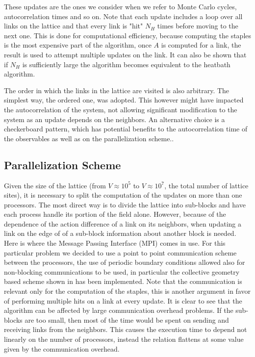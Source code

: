These updates are the ones we consider when we refer to Monte Carlo cycles, autocorrelation times and so on. Note that each update includes a loop over all links on the lattice and that every link is "hit" $N_H$ times before moving to the next one. This is done for computational efficiency, because computing the staples is the most expensive part of the algorithm, once $A$ is computed for a link, the result is used to attempt multiple updates on the link. It can also be shown that if $N_H$ is sufficiently large the algorithm becomes equivalent to the heatbath algorithm. \CIT

The order in which the links in the lattice are visited is also arbitrary. The simplest way, the ordered one, was adopted. This however might have impacted the autocorrelation of the system, not allowing significant modification to the system as an update depends on the neighbors. An alternative choice is a checkerboard pattern, which has potential benefits to the autocorrelation time of the observables as well as on the parallelization scheme.. 

\subsection{Parallelization Scheme}
Given the size of the lattice (from $V \approx 10^5$ to $V\approx 10^7$, the total number of lattice sites), it is necessary to split the computation of the updates on more than one processors. The most direct way is to divide the lattice into sub-blocks and have each process handle its portion of the field alone.  However, because of the dependence of the action difference of a link on its neighbors, when updating a link on the edge of of a sub-block information about another block is needed. Here is where the Message Passing Interface (MPI) comes in use. For this particular problem we decided to use a point to point communication scheme between the processors, the use of periodic boundary conditions allowed also for non-blocking communications to be used, in particular the collective geometry based scheme shown in \LINK has been implemented.
Note that the communication is relevant only for the computation of the staples, this is another argument in favor of performing multiple hits on a link at every update. It is clear to see that the algorithm can be affected by large communication overhead problems. If the sub-blocks are too small, then most of the time would be spent on sending and receiving links from the neighbors. This causes the execution time to depend not linearly on the number of processors, instead the relation flattens at some value given by the communication overhead.

